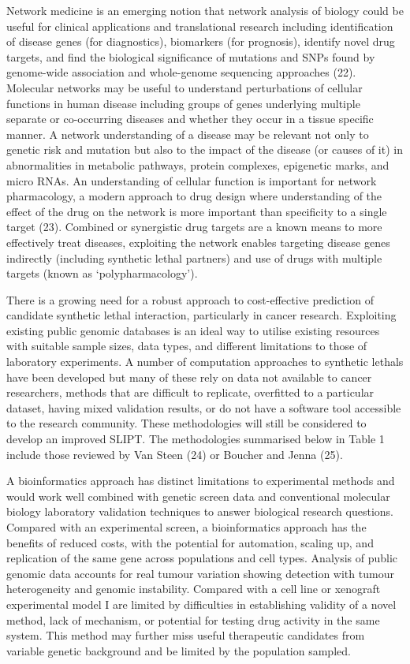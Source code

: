 Network medicine is an emerging notion that network analysis of biology could be useful for clinical applications and translational research including identification of disease genes (for diagnostics), biomarkers (for prognosis), identify novel drug targets, and find the biological significance of \glspl{mutation} and \glspl{SNP} found by \gls{genome}-wide association and whole-genome sequencing approaches (22). Molecular networks may be useful to understand perturbations of cellular functions in human disease including groups of genes underlying multiple separate or co-occurring diseases and whether they occur in a tissue specific manner. A network understanding of a disease may be relevant not only to genetic risk and \gls{mutation} but also to the impact of the disease (or causes of it) in abnormalities in metabolic pathways, protein complexes, epigenetic marks, and micro RNAs. An understanding of cellular function is important for network pharmacology, a modern approach to drug design where understanding of the effect of the drug on the network is more important than specificity to a single target (23). Combined or synergistic drug targets are a known means to more effectively treat diseases, exploiting the network enables targeting disease genes indirectly (including \gls{synthetic lethal} partners) and use of drugs with multiple targets (known as ‘polypharmacology’). 

There is a growing need for a robust approach to cost-effective prediction of candidate \gls{synthetic lethal} interaction, particularly in cancer research. Exploiting existing public \gls{genomic} databases is an ideal way to utilise existing resources with suitable sample sizes, data types, and different limitations to those of laboratory experiments. A number of computation approaches to \glspl{synthetic lethal} have been developed but many of these rely on data not available to cancer researchers, methods that are difficult to replicate, overfitted to a particular dataset, having mixed validation results, or do not have a software tool accessible to the research community. These methodologies will still be considered to develop an improved \gls{SLIPT}. The methodologies summarised below in Table 1 include those reviewed by Van Steen (24) or Boucher and Jenna (25). 

A \gls{bioinformatics} approach has distinct limitations to experimental methods and would work well combined with genetic screen data and conventional molecular biology laboratory validation techniques to answer biological research questions. Compared with an experimental screen, a \gls{bioinformatics} approach has the benefits of reduced costs, with the potential for automation, scaling up, and replication of the same gene across populations and cell types. Analysis of public \gls{genomic} data accounts for real tumour variation showing detection with tumour heterogeneity and genomic instability. Compared with a cell line or xenograft experimental model I are limited by difficulties in establishing validity of a novel method, lack of mechanism, or potential for testing drug activity in the same system. This method may further miss useful therapeutic candidates from variable genetic background and be limited by the population sampled.

